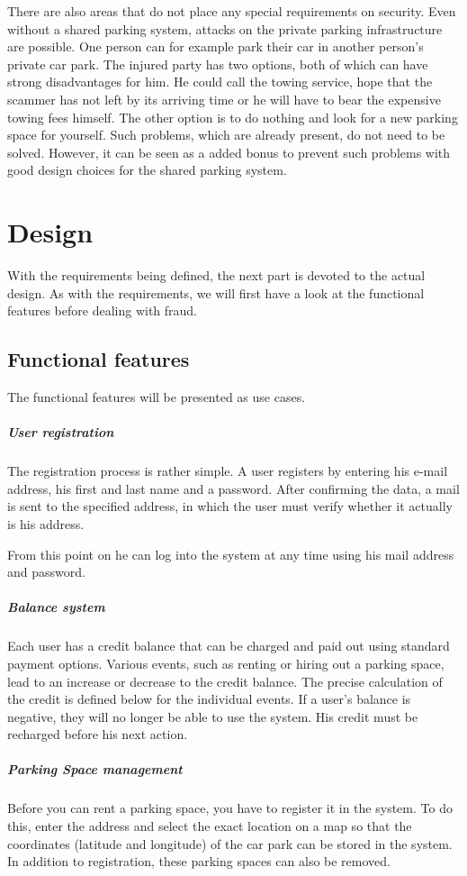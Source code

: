 \documentclass[
a4paper,     %
titlepage,   %
14pt         %
]{scrartcl}  %
\theoremstyle{mystyle}
\begin{document}
There are also areas that do not place any special requirements on security. Even without a shared parking system, attacks on the private parking infrastructure are possible. One person can for example park their car in another person's private car park. The injured party has two options, both of which can have strong disadvantages for him. He could call the towing service, hope that the scammer has not left by its arriving time or he will have to bear the expensive towing fees himself. The other option is to do nothing and look for a new parking space for yourself. Such problems, which are already present, do not need to be solved. However, it can be seen as a added bonus to prevent such problems with good design choices for the shared parking system.


\section{Design}
With the requirements being defined, the next part is devoted to the actual design. As with the requirements, we will first have a look at the functional features before dealing with fraud.

\subsection{Functional features}
The functional features will be presented as use cases.
\subparagraph{User registration} The registration process is rather simple. A user registers by entering his e-mail address, his first and last name and a password. After confirming the data, a mail is sent to the specified address, in which the user must verify whether it actually is his address.

From this point on he can log into the system at any time using his mail address and password.

\subparagraph{Balance system} Each user has a credit balance that can be charged and paid out using standard payment options. Various events, such as renting or hiring out a parking space, lead to an increase or decrease to the credit balance. The precise calculation of the credit is defined below for the individual events. If a user's balance is negative, they will no longer be able to use the system. His credit must be recharged before his next action.

\subparagraph{Parking Space management} Before you can rent a parking space, you have to register it in the system. To do this, enter the address and select the exact location on a map so that the coordinates (latitude and longitude) of the car park can be stored in the system. In addition to registration, these parking spaces can also be removed.
\end{document}
